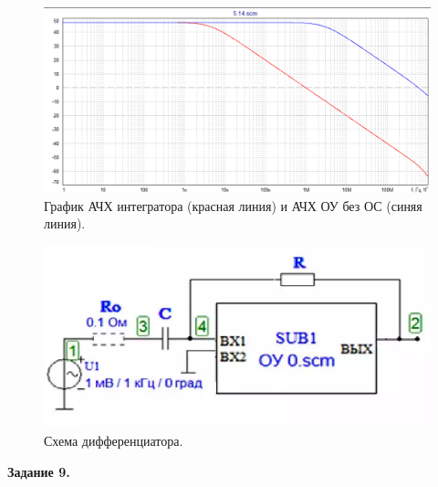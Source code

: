 \documentclass[a4paper,14pt]{extarticle}
\begin{document}
    \begin{figure}[h!]
        \begin{center}
            \includegraphics[scale=0.6]{20.png}
        \end{center}
        \vspace{-0.7cm}
        \caption{График АЧХ интегратора (красная линия) и АЧХ ОУ без ОС (синяя линия).}
    \end{figure}

    \begin{figure}[h!]
        \begin{center}
            \includegraphics[scale=0.6]{21.png}
        \end{center}
        \vspace{-0.7cm}
        \caption{ Схема дифференциатора.}
    \end{figure}

    \newpage
    \begin{center}
        \textbf{Задание 9.}
    \end{center}
\end{document}
